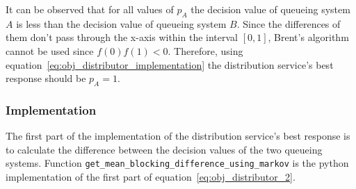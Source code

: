 It can be observed that for all values of \(p_A\) the decision value of queueing
system \(A\) is less than the decision value of queueing system \(B\).
Since the differences of them don't pass through the x-axis within the interval
\([0,1]\), Brent's algorithm cannot be used since \(f(0)f(1) < 0\).
Therefore, using equation~\eqref{eq:obj_distributor_implementation} the
distribution service's best response should be \(p_A = 1\).

\subsubsection{Implementation}

The first part of the implementation of the distribution service's best
response is to calculate the difference between the decision values of the two
queueing systems.
Function \lstinline[style=pystyle]{get_mean_blocking_difference_using_markov}
is the python implementation of the first part of
equation~\eqref{eq:obj_distributor_2}.

